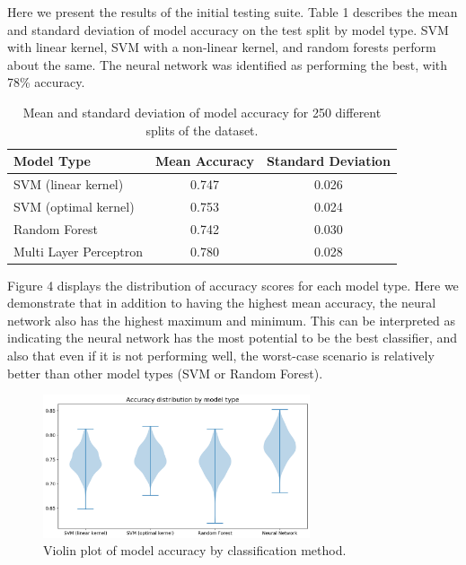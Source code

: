 \documentclass[12pt]{article}
\begin{document}
Here we present the results of the initial testing suite. Table 1 describes the mean and standard deviation of model accuracy on the test split by model type. SVM with linear kernel, SVM with a non-linear kernel, and random forests perform about the same. The neural network was identified as performing the best, with 78\% accuracy. 

\begin{table}[H]
\centering
\begin{tabular}{|l|c|c|}
\hline
\multicolumn{1}{|l|}{Model Type} & Mean Accuracy & \multicolumn{1}{l|}{Standard Deviation} \\ \hline
SVM (linear kernel) & 0.747 & 0.026 \\
\hline
SVM (optimal kernel) & 0.753 & 0.024 \\
\hline
Random Forest & 0.742 & 0.030 \\
\hline
Multi Layer Perceptron & 0.780 & 0.028 \\
\hline
\end{tabular}
\caption{Mean and standard deviation of model accuracy for 250 different splits of the dataset.}
\end{table}

Figure 4 displays the distribution of accuracy scores for each model type. Here we demonstrate that in addition to having the highest mean accuracy, the neural network also has the highest maximum and minimum. This can be interpreted as indicating the neural network has the most potential to be the best classifier, and also that even if it is not performing well, the worst-case scenario is relatively better than other model types (SVM or Random Forest).

\begin{figure}[H]
\centering
\includegraphics[width=0.7\textwidth]{testOut}
\caption{Violin plot of model accuracy by classification method.}
\end{figure}
\end{document}
